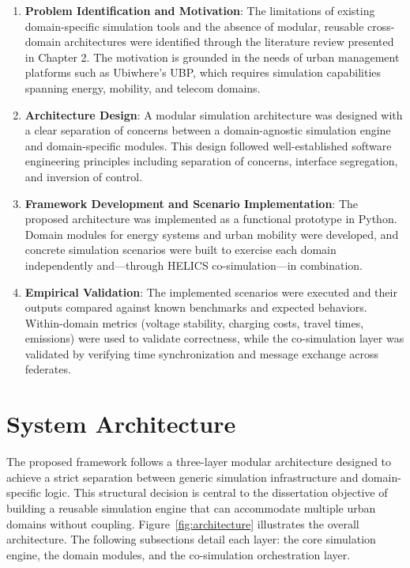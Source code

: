 \begin{enumerate}
    \item \textbf{Problem Identification and Motivation}: The limitations of existing domain-specific simulation tools and the absence of modular, reusable cross-domain architectures were identified through the literature review presented in Chapter 2. The motivation is grounded in the needs of urban management platforms such as Ubiwhere's UBP, which requires simulation capabilities spanning energy, mobility, and telecom domains.

    \item \textbf{Architecture Design}: A modular simulation architecture was designed with a clear separation of concerns between a domain-agnostic simulation engine and domain-specific modules. This design followed well-established software engineering principles including separation of concerns, interface segregation, and inversion of control.

    \item \textbf{Framework Development and Scenario Implementation}: The proposed architecture was implemented as a functional prototype in Python. Domain modules for energy systems and urban mobility were developed, and concrete simulation scenarios were built to exercise each domain independently and---through HELICS co-simulation---in combination.

    \item \textbf{Empirical Validation}: The implemented scenarios were executed and their outputs compared against known benchmarks and expected behaviors. Within-domain metrics (voltage stability, charging costs, travel times, emissions) were used to validate correctness, while the co-simulation layer was validated by verifying time synchronization and message exchange across federates.
\end{enumerate}


\section{System Architecture}

The proposed framework follows a three-layer modular architecture designed to achieve a strict separation between generic simulation infrastructure and domain-specific logic. This structural decision is central to the dissertation objective of building a reusable simulation engine that can accommodate multiple urban domains without coupling. Figure~\ref{fig:architecture} illustrates the overall architecture. The following subsections detail each layer: the core simulation engine, the domain modules, and the co-simulation orchestration layer.

